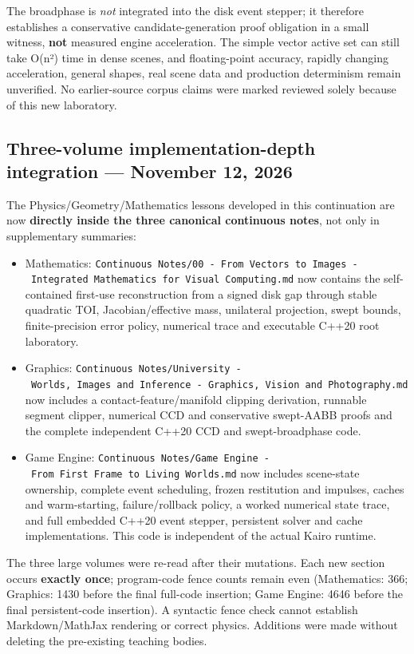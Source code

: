 The broadphase is \emph{not} integrated into the disk event stepper; it therefore establishes a conservative candidate-generation proof obligation in a small witness, \textbf{not} measured engine acceleration. The simple vector active set can still take O(n²) time in dense scenes, and floating-point accuracy, rapidly changing acceleration, general shapes, real scene data and production determinism remain unverified. No earlier-source corpus claims were marked reviewed solely because of this new laboratory.

\subsection{Three-volume implementation-depth integration --- November 12, 2026}\label{appendix-3b67654799a2-three-volume-implementation-depth-integration-november-12-2026}

The Physics/Geometry/Mathematics lessons developed in this continuation are now \textbf{directly inside the three canonical continuous notes}, not only in supplementary summaries:

\begin{itemize}
\tightlist
\item
  Mathematics: \texttt{Continuous\ Notes/00\ -\ From\ Vectors\ to\ Images\ -\ Integrated\ Mathematics\ for\ Visual\ Computing.md} now contains the self-contained first-use reconstruction from a signed disk gap through stable quadratic TOI, Jacobian/effective mass, unilateral projection, swept bounds, finite-precision error policy, numerical trace and executable C++20 root laboratory.
\item
  Graphics: \texttt{Continuous\ Notes/University\ -\ Worlds,\ Images\ and\ Inference\ -\ Graphics,\ Vision\ and\ Photography.md} now includes a contact-feature/manifold clipping derivation, runnable segment clipper, numerical CCD and conservative swept-AABB proofs and the complete independent C++20 CCD and swept-broadphase code.
\item
  Game Engine: \texttt{Continuous\ Notes/Game\ Engine\ -\ From\ First\ Frame\ to\ Living\ Worlds.md} now includes scene-state ownership, complete event scheduling, frozen restitution and impulses, caches and warm-starting, failure/rollback policy, a worked numerical state trace, and full embedded C++20 event stepper, persistent solver and cache implementations. This code is independent of the actual Kairo runtime.
\end{itemize}

The three large volumes were re-read after their mutations. Each new section occurs \textbf{exactly once}; program-code fence counts remain even (Mathematics: 366; Graphics: 1430 before the final full-code insertion; Game Engine: 4646 before the final persistent-code insertion). A syntactic fence check cannot establish Markdown/MathJax rendering or correct physics. Additions were made without deleting the pre-existing teaching bodies.


